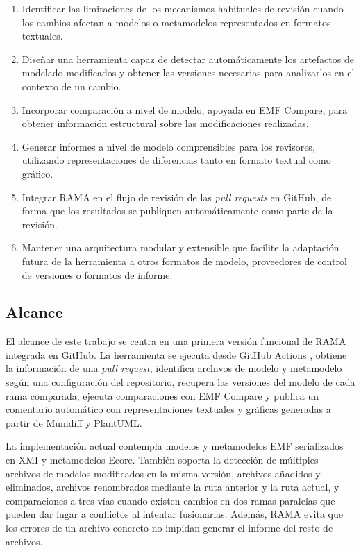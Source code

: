 \documentclass[11pt]{article}
\begin{document}
\begin{enumerate}
    \item Identificar las limitaciones de los mecanismos habituales de revisión cuando los cambios afectan a modelos o metamodelos representados en formatos textuales.
    \item Diseñar una herramienta capaz de detectar automáticamente los artefactos de modelado modificados y obtener las versiones necesarias para analizarlos en el contexto de un cambio.
    \item Incorporar comparación a nivel de modelo, apoyada en EMF Compare, para obtener información estructural sobre las modificaciones realizadas.
    \item Generar informes a nivel de modelo comprensibles para los revisores, utilizando representaciones de diferencias tanto en formato textual como gráfico.
    \item Integrar RAMA en el flujo de revisión de las \textit{pull requests} en GitHub, de forma que los resultados se publiquen automáticamente como parte de la revisión.
    \item Mantener una arquitectura modular y extensible que facilite la adaptación futura de la herramienta a otros formatos de modelo, proveedores de control de versiones o formatos de informe.
\end{enumerate}

\subsection{Alcance}

El alcance de este trabajo se centra en una primera versión funcional de RAMA integrada en GitHub. La herramienta se ejecuta desde GitHub Actions \cite{github-actions}, obtiene la información de una \textit{pull request}, identifica archivos de modelo y metamodelo según una configuración del repositorio, recupera las versiones del modelo de cada rama comparada, ejecuta comparaciones con EMF Compare y publica un comentario automático con representaciones textuales y gráficas generadas a partir de Munidiff y PlantUML.

La implementación actual contempla modelos y metamodelos EMF serializados en XMI y metamodelos Ecore. También soporta la detección de múltiples archivos de modelos modificados en la misma versión, archivos añadidos y eliminados, archivos renombrados mediante la ruta anterior y la ruta actual, y comparaciones a tres vías cuando existen cambios en dos ramas paralelas que pueden dar lugar a conflictos al intentar fusionarlas. Además, RAMA evita que los errores de un archivo concreto no impidan generar el informe del resto de archivos.
\end{document}
